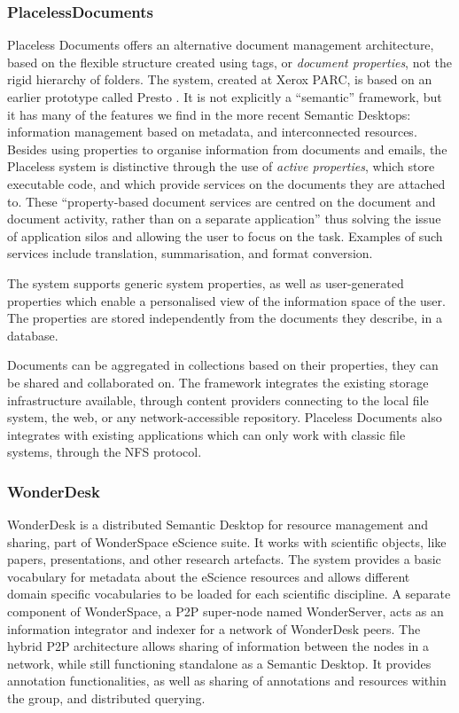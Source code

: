 \subsubsection{PlacelessDocuments} 

Placeless Documents \cite{Dourish2000} offers an alternative document management architecture, based on the flexible structure created using tags, or \emph{document properties}, not the rigid hierarchy of folders. The system, created at Xerox PARC, is based on an earlier prototype called Presto \cite{Dourish1999}. It is not explicitly a ``semantic'' framework, but it has many of the features we find in the more recent Semantic Desktops: information management based on metadata, and interconnected resources. Besides using properties to organise information from documents and emails, the Placeless system is distinctive through the use of \emph{active properties}, which store executable code, and which provide services on the documents they are attached to. These ``property-based document services are centred on the document and document activity, rather than on a separate application'' thus solving the issue of application silos and allowing the user to focus on the task. Examples of such services include 
translation, summarisation, and format conversion.

The system supports generic system properties, as well as user-generated properties which enable a personalised view of the information space of the user. The properties are stored independently from the documents they describe, in a database. 

Documents can be aggregated in collections based on their properties, they can be shared and collaborated on. The framework integrates the existing storage infrastructure available, through content providers connecting to the local file system, the web, or any network-accessible repository. Placeless Documents also integrates with existing applications which can only work with classic file systems, through the NFS protocol.

\subsubsection{WonderDesk}

WonderDesk \cite{Zhang2005} is a distributed Semantic Desktop for resource management and sharing, part of WonderSpace eScience suite. It works with scientific objects, like papers, presentations, and other research artefacts. The system provides a basic vocabulary for metadata about the eScience resources and allows different domain specific vocabularies to be loaded for each scientific discipline. A separate component of WonderSpace, a P2P super-node named WonderServer, acts as an information integrator and indexer for a network of WonderDesk peers. The hybrid P2P architecture allows sharing of information between the nodes in a network, while still functioning standalone as a Semantic Desktop. It provides annotation functionalities, as well as sharing of annotations and resources within the group, and distributed querying. 

